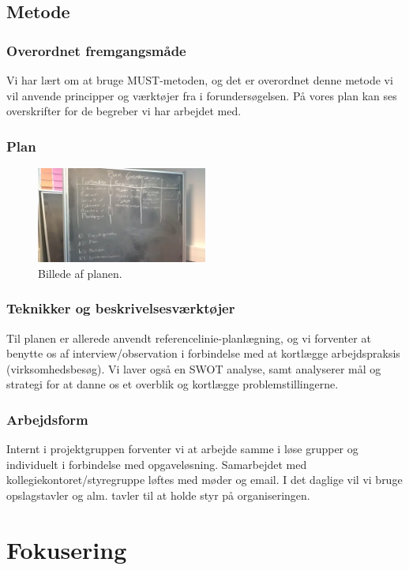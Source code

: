 \documentclass[12pt, a4paper]{report}
\begin{document}
\subsection{Metode}
\subsubsection{Overordnet fremgangsmåde}
Vi har lært om at bruge MUST-metoden, og det er overordnet denne metode vi vil anvende principper og værktøjer fra i forundersøgelsen. På vores plan kan ses overskrifter for de begreber vi har arbejdet med.

\subsubsection{Plan}
\begin{figure}[h!]
\includegraphics[width=0.5\textwidth]{forundersoegelsesplan.jpg}
\caption{Billede af planen.}
\end{figure}

\subsubsection{Teknikker og beskrivelsesværktøjer}
Til planen er allerede anvendt referencelinie-planlægning, og vi forventer at benytte os af interview/observation i forbindelse med at kortlægge arbejdspraksis (virksomhedsbesøg). Vi laver også en SWOT analyse, samt analyserer mål og strategi for at danne os et overblik og kortlægge problemstillingerne.

\subsubsection{Arbejdsform}
Internt i projektgruppen forventer vi at arbejde samme i løse grupper og individuelt i forbindelse med opgaveløsning. Samarbejdet med kollegiekontoret/styregruppe løftes med møder og email.
I det daglige vil vi bruge opslagstavler og alm. tavler til at holde styr på organiseringen.

\section{Fokusering}
\end{document}
